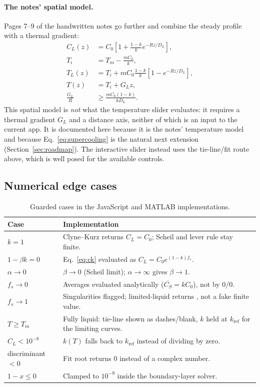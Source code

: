 \documentclass[11pt,a4paper]{article}
\newcommand{\code}[1]{\texttt{\detokenize{#1}}}
\begin{document}
\paragraph{The notes' spatial model.} Pages 7--9 of the handwritten notes go
further and combine the steady profile with a thermal gradient:
\begin{align}
  C_L(z) &= C_0\left[1+\frac{1-k}{k}e^{-Rz/D_L}\right],\\
  T_i &= T_m-\frac{mC_0}{k},\\
  T_L(z) &= T_i+mC_0\frac{1-k}{k}\left[1-e^{-Rz/D_L}\right],\\
  T(z) &= T_i+G_L z,\\
  \frac{G_L}{R} &\ge \frac{mC_0(1-k)}{kD_L}.
  \label{eq:supercooling}
\end{align}
This spatial model is \emph{not} what the temperature slider evaluates: it
requires a thermal gradient $G_L$ and a distance axis, neither of which is an
input to the current app. It is documented here because it is the notes'
temperature model and because Eq.~\eqref{eq:supercooling} is the natural next
extension (Section~\ref{sec:roadmap}). The interactive slider instead uses the
tie-line/fit route above, which is well posed for the available controls.

\subsection{Numerical edge cases}

\begin{table}[h]
\centering
\small
\begin{tabular}{@{}p{}p{}@{}}
\toprule
\textbf{Case} & \textbf{Implementation}\\
\midrule
$k=1$ & Clyne--Kurz returns $C_L=C_0$; Scheil and lever rule stay finite.\\
$1-\beta k=0$ & Eq.~\eqref{eq:ck} evaluated as $C_L=C_0e^{(1-k)f_s}$.\\
$\alpha\to0$ & $\beta\to0$ (Scheil limit); $\alpha\to\infty$ gives $\beta\to1$.\\
$f_s\to0$ & Averages evaluated analytically ($\overline{C_S}=kC_0$), not by $0/0$.\\
$f_s\to1$ & Singularities flagged; limited-liquid returns \code{Inf}, not a fake finite value.\\
$T\ge T_m$ & Fully liquid: tie-line shown as dashes/blank, $k$ held at $k_{\text{ref}}$ for the limiting curves.\\
$C_L<10^{-8}$ & $k(T)$ falls back to $k_{\text{ref}}$ instead of dividing by zero.\\
discriminant $<0$ & Fit root returns $0$ instead of a complex number.\\
$1-x\le0$ & Clamped to $10^{-9}$ inside the boundary-layer solver.\\
\bottomrule
\end{tabular}
\caption{Guarded cases in the JavaScript and MATLAB implementations.}
\end{table}
\end{document}
